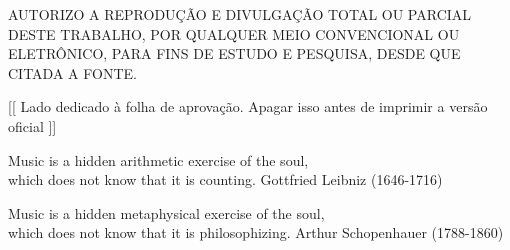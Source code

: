 \capa


\folhaderosto
% 
\pretextualchapter{}
	\thispagestyle{plain}
	\noindent \parbox{5.7in}{\centering AUTORIZO A REPRODUÇÃO E DIVULGAÇÃO TOTAL OU PARCIAL DESTE TRABALHO, POR QUALQUER MEIO CONVENCIONAL OU ELETRÔNICO, PARA FINS DE ESTUDO E PESQUISA, DESDE QUE CITADA A FONTE.}

\pretextualchapter{}
[[	Lado dedicado à folha de aprovação. Apagar isso antes de imprimir a versão oficial ]]



%

\afterpage{\blankpage}




\pretextualchapter{}
	\begin{epigrafetop}
		{Music is a hidden arithmetic exercise of the soul, \\ which does not know that it is counting.}
        {Gottfried Leibniz (1646-1716)}
	\end{epigrafetop}



	\begin{epigrafemid}
		{Music is a hidden metaphysical exercise of the soul, \\ which does not know that it is philosophizing.} %
		{Arthur Schopenhauer (1788-1860)} %
	\end{epigrafemid}
	\vspace{-1cm}


